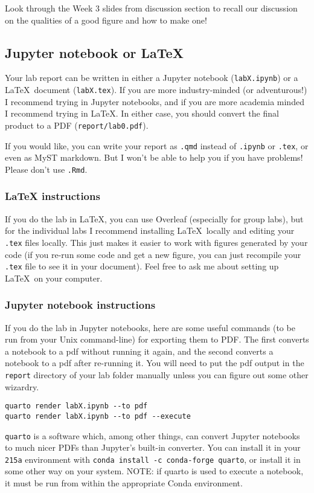 \documentclass[letterpaper,12pt]{article}
\begin{document}
Look through the Week 3 slides from discussion section to recall our discussion on the qualities of a good figure and how to make one!

\subsection{Jupyter notebook or LaTeX}

Your lab report can be written in either a Jupyter notebook (\texttt{labX.ipynb}) or a \LaTeX\ document (\texttt{labX.tex}). If you are more industry-minded (or adventurous!) I recommend trying in Jupyter notebooks, and if you are more academia minded I recommend trying in \LaTeX. In either case, you should convert the final product to a PDF (\texttt{report/lab0.pdf}).

If you would like, you can write your report as \texttt{.qmd} instead of \texttt{.ipynb} or \texttt{.tex}, or even as MyST markdown. But I won't be able to help you if you have problems! Please don't use \texttt{.Rmd}.

\subsubsection{LaTeX instructions}
If you do the lab in \LaTeX, you can use Overleaf (especially for group labs), but for the individual labs I recommend installing \LaTeX\ locally and editing your \texttt{.tex} files locally. This just makes it easier to work with figures generated by your code (if you re-run some code and get a new figure, you can just recompile your \texttt{.tex} file to see it in your document). Feel free to ask me about setting up \LaTeX\ on your computer.

\subsubsection{Jupyter notebook instructions}
If you do the lab in Jupyter notebooks, here are some useful commands (to be run from your Unix command-line) for exporting them to PDF. The first converts a notebook to a pdf without running it again, and the second converts a notebook to a pdf after re-running it. You will need to put the pdf output in the \texttt{report} directory of your lab folder manually unless you can figure out some other wizardry.
\begin{verbatim}
quarto render labX.ipynb --to pdf
quarto render labX.ipynb --to pdf --execute
\end{verbatim}
\texttt{quarto} is a software which, among other things, can convert Jupyter notebooks to much nicer PDFs than Jupyter's built-in converter. You can install it in your \texttt{215a} environment with \texttt{conda install -c conda-forge quarto}, or install it in some other way on your system. NOTE: if quarto is used to execute a notebook, it must be run from within the appropriate Conda environment.
\end{document}
